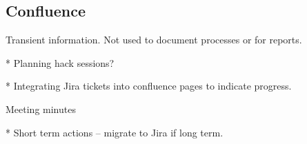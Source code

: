 \subsection{Confluence}

Transient information. Not used to document processes or for reports.

* Planning hack sessions?

* Integrating Jira tickets into confluence pages to indicate progress.

Meeting minutes

* Short term actions -- migrate to Jira if long term.
